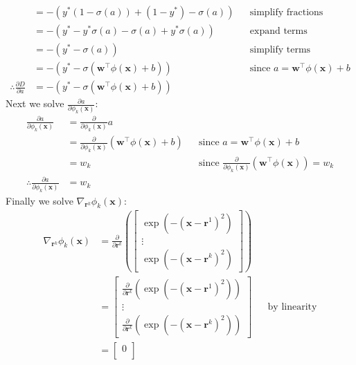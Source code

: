 \documentclass [10pt]{article}
\begin{document}
\begin{enumerate}
\begin{align}
		&= -(y^{*}(1-\sigma(a))+(1-y^{*})-\sigma(a)) && \text{simplify fractions} \nonumber \\
		&= -(y^{*}-y^{*}\sigma(a)-\sigma(a)+y^{*}\sigma(a)) && \text{expand terms} \nonumber \\
		&= -(y^{*}-\sigma(a)) && \text{simplify terms} \nonumber \\
		&= -(y^{*}-\sigma(\textbf{w}^{\top}\phi(\textbf{x})+b)) && \text{since $a = \textbf{w}^{\top}\phi(\textbf{x})+b$} \nonumber \\
		\therefore \frac{\partial D}{\partial a} &= -(y^{*}-\sigma(\textbf{w}^{\top}\phi(\textbf{x})+b)) \nonumber
	\end{align}
	Next we solve $\frac{\partial a}{\partial \phi_{k}(\textbf{x})}$:
	\begin{align}
		\frac{\partial a}{\partial \phi_{k}(\textbf{x})} &= \frac{\partial}{\partial \phi_{k}(\textbf{x})} a \nonumber \\
		&= \frac{\partial}{\partial \phi_{k}(\textbf{x})} (\textbf{w}^{\top}\phi(\textbf{x})+b) && \text{since $a=\textbf{w}^{\top}\phi(\textbf{x})+b$} \nonumber \\
		&= w_{k} && \text{since $\frac{\partial}{\partial \phi_{k}(\textbf{x})} (\textbf{w}^{\top}\phi(\textbf{x}))=w_{k}$} \nonumber \\
		\therefore \frac{\partial a}{\partial \phi_{k}(\textbf{x})} &= w_{k} \nonumber
	\end{align}
	Finally we solve $\nabla_{\textbf{r}^{k}} \phi_{k}(\textbf{x})$:
	\begin{align}
		\nabla_{\textbf{r}^{k}} \phi_{k}(\textbf{x}) &= \frac{\partial}{\partial \textbf{r}^{k}} (
		\begin{bmatrix}
			\exp(-(\textbf{x}-\textbf{r}^{1})^{2}) \\
			\vdots \\
			\exp(-(\textbf{x}-\textbf{r}^{k})^{2})
		\end{bmatrix} ) \nonumber \\
		&= \begin{bmatrix}
			\frac{\partial}{\partial \textbf{r}^{k}} (\exp(-(\textbf{x}-\textbf{r}^{1})^{2})) \\
			\vdots \\
			\frac{\partial}{\partial \textbf{r}^{k}} (\exp(-(\textbf{x}-\textbf{r}^{k})^{2}))
		\end{bmatrix} && \text{by linearity} \nonumber \\
		&= \begin{bmatrix}
			0 \\

\end{bmatrix}
\end{align}
\end{enumerate}
\end{document}
